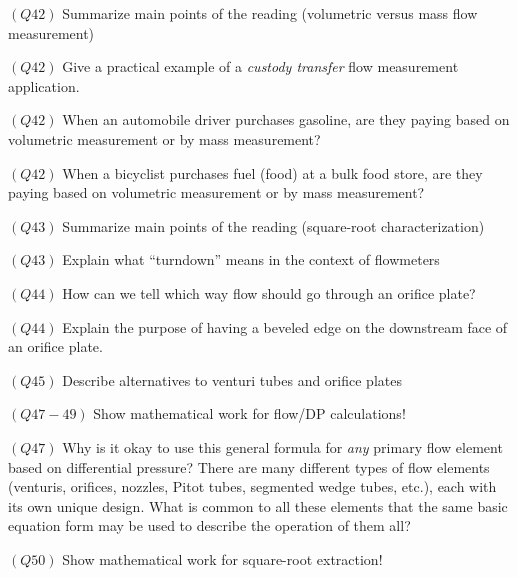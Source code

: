 \medskip
\item{$(Q42)$} Summarize main points of the reading (volumetric versus mass flow measurement)
\item{$(Q42)$} Give a practical example of a {\it custody transfer} flow measurement application.
\item{$(Q42)$} When an automobile driver purchases gasoline, are they paying based on volumetric measurement or by mass measurement?
\item{$(Q42)$} When a bicyclist purchases fuel (food) at a bulk food store, are they paying based on volumetric measurement or by mass measurement?
\item{$(Q43)$} Summarize main points of the reading (square-root characterization)
\item{$(Q43)$} Explain what ``turndown'' means in the context of flowmeters
\item{$(Q44)$} How can we tell which way flow should go through an orifice plate?
\item{$(Q44)$} Explain the purpose of having a beveled edge on the downstream face of an orifice plate.
\item{$(Q45)$} Describe alternatives to venturi tubes and orifice plates
\item{$(Q47-49)$} Show mathematical work for flow/DP calculations!
\item{$(Q47)$} Why is it okay to use this general formula for {\it any} primary flow element based on differential pressure?  There are many different types of flow elements (venturis, orifices, nozzles, Pitot tubes, segmented wedge tubes, etc.), each with its own unique design.  What is common to all these elements that the same basic equation form may be used to describe the operation of them all?
\item{$(Q50)$} Show mathematical work for square-root extraction!
\medskip

